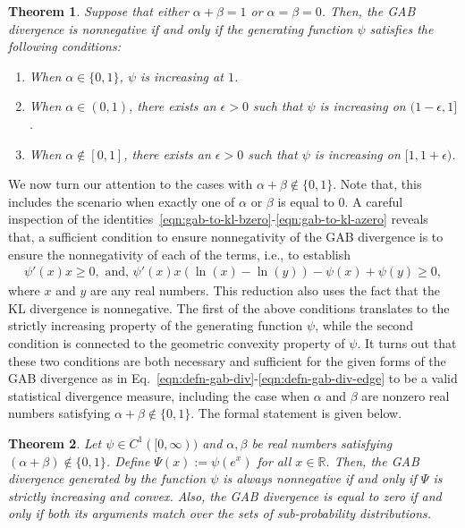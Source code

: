 \documentclass[11pt]{article}
\theoremstyle{plain}
\newtheorem{theorem}{Theorem}[section]
\theoremstyle{remark}
\def\R{\mathbb{R}}
\begin{document}
\begin{theorem}\label{thm:gab-div-alpha-plus-beta-1}
    Suppose that either $\alpha + \beta = 1$ or $\alpha = \beta = 0$. Then, the GAB divergence is nonnegative if and only if the generating function $\psi$ satisfies the following conditions:
    \begin{enumerate}
        \item When $\alpha \in \{0, 1\}$, $\psi$ is increasing at $1$.
        \item When $\alpha \in (0, 1)$, there exists an $\epsilon > 0$ such that $\psi$ is increasing on $(1-\epsilon, 1]$.
        \item When $\alpha \notin [0, 1]$, there exists an $\epsilon > 0$ such that $\psi$ is increasing on $[1, 1+\epsilon)$.
    \end{enumerate}
\end{theorem}

We now turn our attention to the cases with $\alpha + \beta \notin \{0, 1\}$. Note that, this includes the scenario when exactly one of $\alpha$ or $\beta$ is equal to $0$. A careful inspection of the identities~\eqref{eqn:gab-to-kl-bzero}-\eqref{eqn:gab-to-kl-azero} reveals that, a sufficient condition to ensure nonnegativity of the GAB divergence is to ensure the nonnegativity of each of the terms, i.e., to establish
\begin{align*}
    \psi'(x) x \geq 0, \text{ and, }
    \psi'(x) x (\ln(x) - \ln(y)) - \psi(x) + \psi(y) \geq 0,
\end{align*}
\noindent where $x$ and $y$ are any real numbers. This reduction also uses the fact that the KL divergence is nonnegative. The first of the above conditions translates to the strictly increasing property of the generating function $\psi$, while the second condition is connected to the geometric convexity property of $\psi$. It turns out that these two conditions are both necessary and sufficient for the given forms of the GAB divergence as in Eq.~\eqref{eqn:defn-gab-div}-\eqref{eqn:defn-gab-div-edge} to be a valid statistical divergence measure, including the case when $\alpha$ and $\beta$ are nonzero real numbers satisfying $\alpha + \beta \notin \{0, 1\}$. The formal statement is given below.
\begin{theorem}\label{thm:gab-div-nec-suff}
    Let $\psi \in C^1([0, \infty))$ and $\alpha, \beta$ be real numbers satisfying $(\alpha +\beta) \notin \{0, 1\}$. Define $\Psi(x) := \psi(e^x)$ for all $x \in \R$. Then, the GAB divergence generated by the function $\psi$ is always nonnegative if and only if $\Psi$ is strictly increasing and convex. Also, the GAB divergence is equal to zero if and only if both its arguments match over the sets of sub-probability distributions.
\end{theorem}
\end{document}
